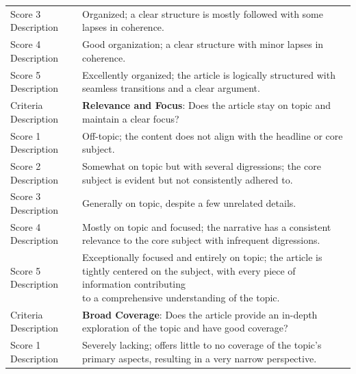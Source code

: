 \begin{table}
{\begin{tabular}{ll}
Score 3 Description  & Organized; a clear structure is mostly followed with some lapses in coherence.                                                                                                 \\
Score 4 Description  & Good organization; a clear structure with minor lapses in coherence.                                                                                                                      \\
Score 5 Description  & Excellently organized; the article is logically structured with seamless transitions and a clear argument.                                                                                \\ 
\midrule
Criteria Description & \textbf{Relevance and Focus}: Does the article stay on topic and maintain a clear focus?                                                                                                  \\
Score 1 Description  & Off-topic; the content does not align with the headline or core subject.                                                                                                                  \\
Score 2 Description  & Somewhat on topic but with several digressions; the core subject is evident but not consistently adhered to.                                                                              \\
Score 3 Description  & Generally on topic, despite a few unrelated details.                                                                                                                                      \\
Score 4 Description  & Mostly on topic and focused; the narrative has a consistent relevance to the core subject with infrequent digressions.                                                                    \\
Score 5 Description  & \makecell[l]{Exceptionally focused and entirely on topic; the article is tightly centered on the subject, with every piece of information contributing \\to a comprehensive understanding of the topic.}  \\ 
\midrule
Criteria Description & \textbf{Broad Coverage}: Does the article provide an in-depth exploration of the topic and have good coverage?                                                                            \\
Score 1 Description  & Severely lacking; offers little to no coverage of the topic's primary aspects, resulting in a very narrow perspective.                                                                    \\

\end{tabular}}
\end{table}
